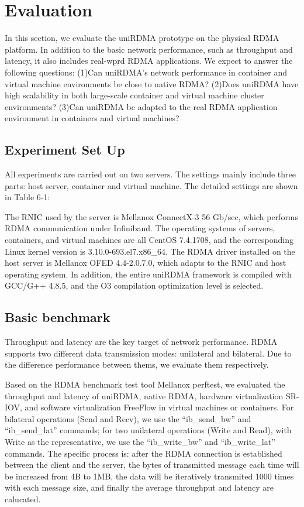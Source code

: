 \documentclass[sigplan,screen]{acmart}
\begin{document}
\section{Evaluation}
In this section, we evaluate the uniRDMA prototype on the physical RDMA platform. In addition to the basic network performance, such as throughput and latency, it also includes real-wprd RDMA applications. We expect to answer the following questions:
(1)Can uniRDMA's network performance in container and virtual machine environments be close to native RDMA?
(2)Does uniRDMA have high scalability in both large-scale container and virtual machine cluster environments?
(3)Can uniRDMA be adapted to the real RDMA application environment in containers and virtual machines?
	
\subsection{Experiment Set Up}
All experiments are carried out on two servers. The settings mainly include three parts: host server, container and virtual machine. The detailed settings are shown in Table 6-1:

The RNIC used by the server is Mellanox ConnectX-3 56 Gb/sec, which performs RDMA communication under Infiniband. The operating systems of servers, containers, and virtual machines are all CentOS 7.4.1708, and the corresponding Linux kernel version is 3.10.0-693.el7.x86\_64. The RDMA driver installed on the host server is Mellanox OFED 4.4-2.0.7.0, which adapts to the RNIC and host operating system. In addition, the entire uniRDMA framework is compiled with GCC/G++ 4.8.5, and the O3 compilation optimization level is selected.

\subsection{Basic benchmark}
Throughput and latency are the key target of network performance. RDMA supports two different data transmission modes: unilateral and bilateral. Due to the difference performance between thems, we evaluate them respectively.

Based on the RDMA benchmark test tool Mellanox perftest, we evaluated the throughput and latency of uniRDMA, native RDMA, hardware virtualization SR-IOV, and software virtualization FreeFlow in virtual machines or containers. For bilateral operations (Send and Recv), we use the ``ib\_send\_bw'' and ``ib\_send\_lat'' commands; for two unilateral operations (Write and Read), with Write as the representative, we use the ``ib\_write\_bw'' and ``ib\_write\_lat'' commands. The specific process is: after the RDMA connection is established between the client and the server, the bytes of  transmitted message each time will be increased from 4B to 1MB, the data will be iteratively transmited 1000 times with each message size, and finally the average throughput and latency are calucated.
\end{document}
